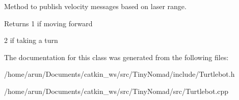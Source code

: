 Method to publish velocity messages based on laser range. 

\begin{DoxyReturn}{Returns}
1 if moving forward 

2 if taking a turn 
\end{DoxyReturn}


The documentation for this class was generated from the following files\+:\begin{DoxyCompactItemize}
\item 
/home/arun/\+Documents/catkin\+\_\+ws/src/\+Tiny\+Nomad/include/Turtlebot.\+h\item 
/home/arun/\+Documents/catkin\+\_\+ws/src/\+Tiny\+Nomad/src/Turtlebot.\+cpp\end{DoxyCompactItemize}

